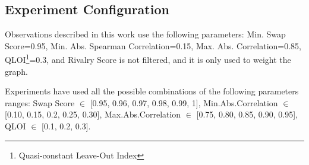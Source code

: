 \subsection{Experiment Configuration}
\label{section:cfg}
Observations described in this work use the following parameters: Min. Swap Score=0.95, Min. Abs. Spearman Correlation=0.15, Max. Abs. Correlation=0.85, QLOI\footnote{Quasi-constant Leave-Out Index}=0.3, and Rivalry Score is not filtered, and it is only used to weight the graph.

Experiments have used all the possible combinations of the following parameters ranges: Swap Score $\in$ [0.95, 0.96, 0.97, 0.98, 0.99, 1], Min.Abs.Correlation $\in$ [0.10, 0.15, 0.2, 0.25, 0.30], Max.Abs.Correlation $\in$ [0.75, 0.80, 0.85, 0.90, 0.95], QLOI $\in$ [0.1, 0.2, 0.3].